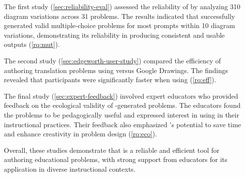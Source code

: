 The first study (\cref{sec:reliability-eval}) assessed the reliability of \Edgeworth by analyzing 310 diagram variations across 31 problems. The results indicated that \Edgeworth successfully generated valid multiple-choice problems for most prompts within 10 diagram variations, demonstrating its reliability in producing consistent and usable outputs (\ref{rq:mut}).

The second study (\cref{sec:edgeworth-user-study}) compared the efficiency of authoring translation problems using \Edgeworth versus Google Drawings. The findings revealed that participants were significantly faster when using \Edgeworth (\ref{rq:eff}).

The final study (\cref{sec:expert-feedback}) involved expert educators who provided feedback on the ecological validity of \Edgeworth-generated problems. The educators found the problems to be pedagogically useful and expressed interest in using \Edgeworth in their instructional practices. Their feedback also emphasized \Edgeworth's potential to save time and enhance creativity in problem design (\ref{rq:eco}).

Overall, these studies demonstrate that \Edgeworth is a reliable and efficient tool for authoring educational problems, with strong support from educators for its application in diverse instructional contexts.





